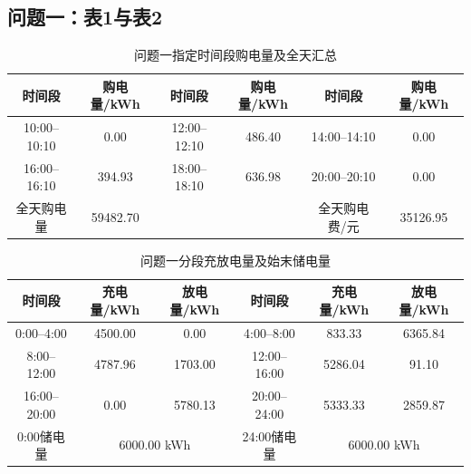 \documentclass[12pt,a4paper,fontset=fandol]{ctexart}
\begin{document}
\subsection{问题一：表1与表2}
\begin{table}[htbp]\centering\scriptsize
\caption{问题一指定时间段购电量及全天汇总}
\begin{tabular}{cc|cc|cc}\toprule 时间段&购电量/kWh&时间段&购电量/kWh&时间段&购电量/kWh\\\midrule
10:00--10:10&0.00&12:00--12:10&486.40&14:00--14:10&0.00\\
16:00--16:10&394.93&18:00--18:10&636.98&20:00--20:10&0.00\\\midrule
全天购电量&59482.70&&&全天购电费/元&35126.95\\\bottomrule\end{tabular}\end{table}
\begin{table}[htbp]\centering\scriptsize
\caption{问题一分段充放电量及始末储电量}
\begin{tabular}{ccc|ccc}\toprule 时间段&充电量/kWh&放电量/kWh&时间段&充电量/kWh&放电量/kWh\\\midrule
0:00--4:00&4500.00&0.00&4:00--8:00&833.33&6365.84\\
8:00--12:00&4787.96&1703.00&12:00--16:00&5286.04&91.10\\
16:00--20:00&0.00&5780.13&20:00--24:00&5333.33&2859.87\\\midrule
0:00储电量&\multicolumn{2}{c|}{6000.00 kWh}&24:00储电量&\multicolumn{2}{c}{6000.00 kWh}\\\bottomrule\end{tabular}\end{table}


\clearpage


\clearpage
\end{document}
